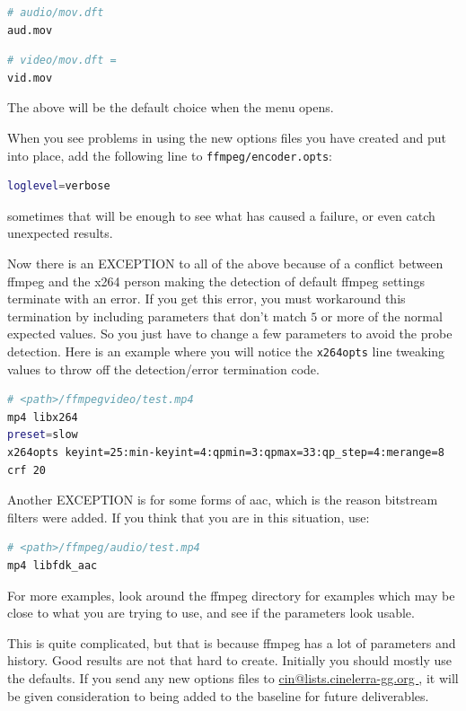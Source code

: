 \begin{lstlisting}[language=bash]
# audio/mov.dft
aud.mov
\end{lstlisting}

\begin{lstlisting}[language=bash]
# video/mov.dft =
vid.mov
\end{lstlisting}

The above will be the default choice when the menu opens.  

When you see problems in using the new options files you have created and put into place, add the following line to \texttt{ffmpeg/encoder.opts}:

\begin{lstlisting}[language=bash]
loglevel=verbose
\end{lstlisting}

sometimes that will be enough to see what has caused a failure, or even catch unexpected results.

Now there is an \textsc{EXCEPTION} to all of the above because of a conflict between ffmpeg and the x264 person making the detection of default ffmpeg settings terminate with an error.  If you get this error, you must workaround this termination by including parameters that don't match $5$ or more of the normal expected values.  So you just have to change a few parameters to avoid the probe detection.  Here is an example where you will notice the \texttt{x264opts} line tweaking values to throw off the detection/error termination code.

\begin{lstlisting}[language=bash]
# <path>/ffmpegvideo/test.mp4
mp4 libx264
preset=slow
x264opts keyint=25:min-keyint=4:qpmin=3:qpmax=33:qp_step=4:merange=8
crf 20
\end{lstlisting}

Another \textsc{EXCEPTION} is for some forms of aac, which is the reason bitstream filters were added.
If you think that you are in this situation, use:

\begin{lstlisting}[language=bash]
# <path>/ffmpeg/audio/test.mp4
mp4 libfdk_aac
\end{lstlisting}

For more examples, look around the ffmpeg directory for examples which may be close to what you are trying to use, and see if the parameters look usable. 

This is quite complicated, but that is because ffmpeg has a lot of parameters and history.  Good results are not that hard to create.  Initially you should mostly use the defaults.  If you send any new options files to \url{cin@lists.cinelerra-gg.org }, it will be given consideration to being added to the baseline for future deliverables.

